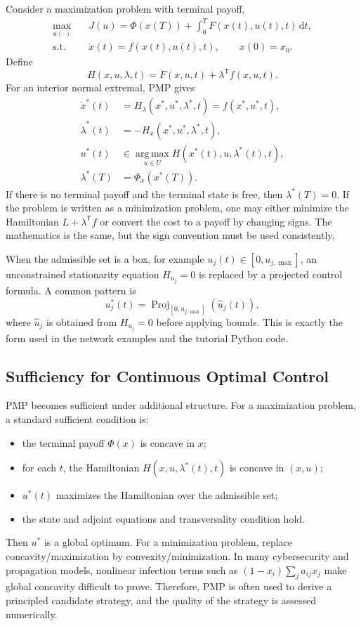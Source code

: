 \documentclass[11pt,a4paper]{article}
\newcommand{\dd}{\,\mathrm{d}}
\newcommand{\argmax}{\operatorname*{arg\,max}}
\newcommand{\Proj}{\operatorname{Proj}}
\newcommand{\T}{\mathsf{T}}
\begin{document}
Consider a maximization problem with terminal payoff,
\begin{align}
  \max_{u(\cdot)}\quad & J(u)=\Phi(x(T))+\int_0^T F(x(t),u(t),t)\dd t,\\
  \text{s.t.}\quad & \dot{x}(t)=f(x(t),u(t),t),\qquad x(0)=x_0.
\end{align}
Define
\begin{equation}
  H(x,u,\lambda,t)=F(x,u,t)+\lambda^{\T} f(x,u,t).
\end{equation}
For an interior normal extremal, PMP gives
\begin{align}
  \dot{x}^*(t)&=H_\lambda(x^*,u^*,\lambda^*,t)=f(x^*,u^*,t),\\
  \dot{\lambda}^*(t)&=-H_x(x^*,u^*,\lambda^*,t),\\
  u^*(t)&\in\argmax_{u\in U}H(x^*(t),u,\lambda^*(t),t),\\
  \lambda^*(T)&=\Phi_x(x^*(T)).
\end{align}
If there is no terminal payoff and the terminal state is free, then $\lambda^*(T)=0$. If the problem is written as a minimization problem, one may either minimize the Hamiltonian $L+\lambda^{\T}f$ or convert the cost to a payoff by changing signs. The mathematics is the same, but the sign convention must be used consistently.

When the admissible set is a box, for example $u_j(t)\in[0,u_{j,\max}]$, an unconstrained stationarity equation $H_{u_j}=0$ is replaced by a projected control formula. A common pattern is
\begin{equation}
  u_j^*(t)=\Proj_{[0,u_{j,\max}]}\left(\widehat{u}_j(t)\right),
\end{equation}
where $\widehat{u}_j$ is obtained from $H_{u_j}=0$ before applying bounds. This is exactly the form used in the network examples and the tutorial Python code.

\subsection{Sufficiency for Continuous Optimal Control}

PMP becomes sufficient under additional structure. For a maximization problem, a standard sufficient condition is:
\begin{itemize}
  \item the terminal payoff $\Phi(x)$ is concave in $x$;
  \item for each $t$, the Hamiltonian $H(x,u,\lambda^*(t),t)$ is concave in $(x,u)$;
  \item $u^*(t)$ maximizes the Hamiltonian over the admissible set;
  \item the state and adjoint equations and transversality condition hold.
\end{itemize}
Then $u^*$ is a global optimum. For a minimization problem, replace concavity/maximization by convexity/minimization. In many cybersecurity and propagation models, nonlinear infection terms such as $(1-x_i)\sum_j a_{ij}x_j$ make global concavity difficult to prove. Therefore, PMP is often used to derive a principled candidate strategy, and the quality of the strategy is assessed numerically.
\end{document}
